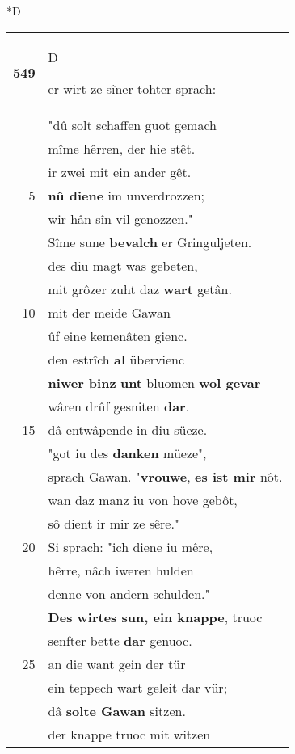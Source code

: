 \documentclass[8pt,a4paper,notitlepage]{article}
\begin{document}
\begin{table}[ht]
\begin{minipage}[t]{0.5\linewidth}
\small
\begin{center}*D
\end{center}
\begin{tabular}{rl}
\textbf{549} & \begin{large}D\end{large}er wirt ze sîner tohter sprach:\\ 
 & "dû solt schaffen guot gemach\\ 
 & mîme hêrren, der hie stêt.\\ 
 & ir zwei mit ein ander gêt.\\ 
5 & \textbf{nû diene} im unverdrozzen;\\ 
 & wir hân sîn vil genozzen."\\ 
 & Sîme sune \textbf{bevalch} er Gringuljeten.\\ 
 & des diu magt was gebeten,\\ 
 & mit grôzer zuht daz \textbf{wart} getân.\\ 
10 & mit der meide Gawan\\ 
 & ûf eine kemenâten gienc.\\ 
 & den estrîch \textbf{al} übervienc\\ 
 & \textbf{niwer binz} \textbf{unt} bluomen \textbf{wol gevar}\\ 
 & wâren drûf gesniten \textbf{dar}.\\ 
15 & dâ entwâpende in diu süeze.\\ 
 & "got iu des \textbf{danken} müeze",\\ 
 & sprach Gawan. "\textbf{vrouwe}, \textbf{es ist mir} nôt.\\ 
 & wan daz manz iu von hove gebôt,\\ 
 & sô dient ir mir ze sêre."\\ 
20 & Si sprach: "ich diene iu mêre,\\ 
 & hêrre, nâch iweren hulden\\ 
 & denne von andern schulden."\\ 
 & \textbf{Des wirtes sun, ein knappe}, truoc\\ 
 & senfter bette \textbf{dar} genuoc.\\ 
25 & an die want gein der tür\\ 
 & ein teppech wart geleit dar vür;\\ 
 & dâ \textbf{solte Gawan} sitzen.\\ 
 & der knappe truoc mit witzen\\ 

\end{tabular}
\end{minipage}
\end{table}
\end{document}
